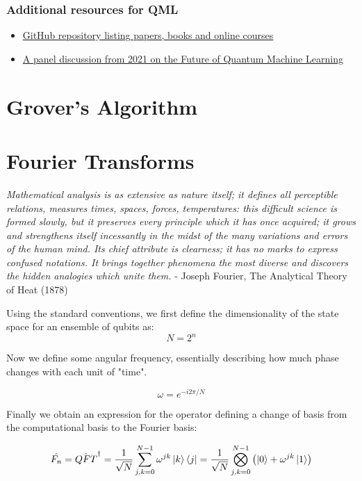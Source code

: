 \documentclass{book}
\begin{document}
\subsection{Additional resources for QML}
\begin{itemize}
    \item \href{https://github.com/Christophe-pere/Roadmap-to-QML}{GitHub repository listing papers, books and online courses}
    \item \href{https://www.youtube.com/watch?v=5UsJV2BNj2U&list=PLOFEBzvs-VvppIb0jg5_aDbmFs36DXD9w}{A panel discussion from 2021 on the Future of Quantum Machine Learning}
\end{itemize}

\chapter{Grover's Algorithm}

\chapter{Fourier Transforms}

\textit{Mathematical analysis is as extensive as nature itself; it defines all perceptible relations, measures times, spaces, forces, temperatures: this difficult science is formed slowly, but it preserves every principle which it has once acquired; it grows and strengthens itself incessantly in the midst of the many variations and errors of the human mind. Its chief attribute is clearness; it has no marks to express confused notations. It brings together phenomena the most diverse and discovers the hidden analogies which unite them.} - Joseph Fourier, The Analytical Theory of Heat (1878) 

Using the standard conventions, we first define the dimensionality of the state space for an ensemble of qubits as: 
$$ N = 2^n $$

Now we define some angular frequency, essentially describing how much phase changes with each unit of "time". 

$$ \omega = e^{-i2\pi /N} $$

Finally we obtain an expression for the operator defining a change of basis from the computational basis to the Fourier basis:

$$\hat{F_n} = \hat{QFT}^{\dagger} = \frac{1}{\sqrt{N}} \sum_{j,k = 0}^{N-1}\omega^{jk} \ket{k}\bra{j} = \frac{1}{\sqrt{N}}\bigotimes_{j,k = 0}^{N-1}\left(\ket{0} + \omega^{jk}\ket{1} \right)$$
\end{document}
